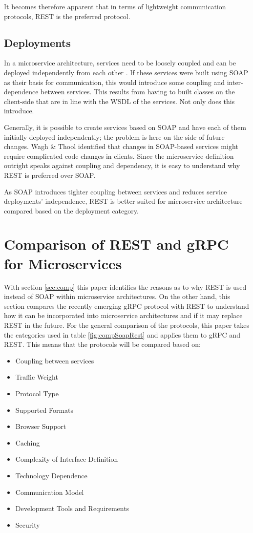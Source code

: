 \documentclass[conference]{IEEEtran}
\begin{document}
It becomes therefore apparent that in terms of lightweight communication protocols, REST is the preferred protocol.

\subsection{Deployments}

In a microservice architecture, services need to be loosely coupled and can be deployed independently from each other \cite{karmel2016nist}. If these services were built using SOAP as their basis for communication, this would introduce some coupling and inter-dependence between services. This results from having to built classes on the client-side that are in line with the WSDL of the services. Not only does this introduce.

Generally, it is possible to create services based on SOAP and have each of them initially deployed independently; the problem is here on the side of future changes. Wagh \& Thool \cite{wagh2012comparative} identified that changes in SOAP-based services might require complicated code changes in clients. Since the microservice definition outright speaks against coupling and dependency, it is easy to understand why REST is preferred over SOAP.

As SOAP introduces tighter coupling between services and reduces service deployments' independence, REST is better suited for microservice architecture compared based on the deployment category. 

\section{Comparison of REST and gRPC for Microservices}
\label{sec:compgrpc}

With section \ref{sec:comp} this paper identifies the reasons as to why REST is used instead of SOAP within microservice architectures. On the other hand, this section compares the recently emerging gRPC protocol with REST to understand how it can be incorporated into microservice architectures and if it may replace REST in the future. For the general comparison of the protocols, this paper takes the categories used in table \ref{fig:compSoapRest} and applies them to gRPC and REST. This means that the protocols will be compared based on: 

\begin{itemize}
	\item Coupling between services
	\item Traffic Weight
	\item Protocol Type
	\item Supported Formats
	\item Browser Support
	\item Caching
	\item Complexity of Interface Definition
	\item Technology Dependence
	\item Communication Model
	\item Development Tools and Requirements
	\item Security
\end{itemize}
\end{document}
